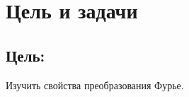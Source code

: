 \chapter*{Цель и задачи}
\label{ch:intro}

\section*{\textbf{Цель:}}

Изучить свойства преобразования Фурье.

\endinput